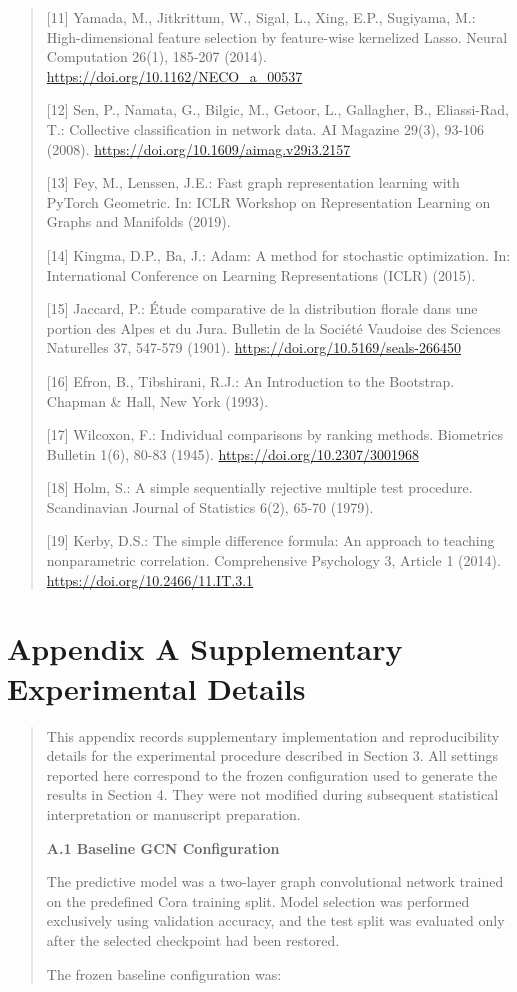 \documentclass[a4paper]{article}
\begin{document}
\begin{quote}
{[}11{]} Yamada, M., Jitkrittum, W., Sigal, L., Xing, E.P., Sugiyama,
M.: High-dimensional feature selection by feature-wise kernelized Lasso.
Neural Computation 26(1), 185-207 (2014).
\url{https://doi.org/10.1162/NECO_a_00537}

{[}12{]} Sen, P., Namata, G., Bilgic, M., Getoor, L., Gallagher, B.,
Eliassi-Rad, T.: Collective classification in network data. AI Magazine
29(3), 93-106 (2008). \url{https://doi.org/10.1609/aimag.v29i3.2157}

{[}13{]} Fey, M., Lenssen, J.E.: Fast graph representation learning with
PyTorch Geometric. In: ICLR Workshop on Representation Learning on
Graphs and Manifolds (2019).

{[}14{]} Kingma, D.P., Ba, J.: Adam: A method for stochastic
optimization. In: International Conference on Learning Representations
(ICLR) (2015).

{[}15{]} Jaccard, P.: Étude comparative de la distribution florale dans
une portion des Alpes et du Jura. Bulletin de la Société Vaudoise des
Sciences Naturelles 37, 547-579 (1901).
\url{https://doi.org/10.5169/seals-266450}

{[}16{]} Efron, B., Tibshirani, R.J.: An Introduction to the Bootstrap.
Chapman \& Hall, New York (1993).

{[}17{]} Wilcoxon, F.: Individual comparisons by ranking methods.
Biometrics Bulletin 1(6), 80-83 (1945).
\url{https://doi.org/10.2307/3001968}

{[}18{]} Holm, S.: A simple sequentially rejective multiple test
procedure. Scandinavian Journal of Statistics 6(2), 65-70 (1979).

{[}19{]} Kerby, D.S.: The simple difference formula: An approach to
teaching nonparametric correlation. Comprehensive Psychology 3, Article
1 (2014). \url{https://doi.org/10.2466/11.IT.3.1}
\end{quote}

\section{Appendix A Supplementary Experimental
Details}\label{appendix-a-supplementary-experimental-details}

\begin{quote}
This appendix records supplementary implementation and reproducibility
details for the experimental procedure described in Section 3. All
settings reported here correspond to the frozen configuration used to
generate the results in Section 4. They were not modified during
subsequent statistical interpretation or manuscript preparation.

\textbf{A.1 Baseline GCN Configuration}

The predictive model was a two-layer graph convolutional network trained
on the predefined Cora training split. Model selection was performed
exclusively using validation accuracy, and the test split was evaluated
only after the selected checkpoint had been restored.

The frozen baseline configuration was:
\end{quote}
\end{document}
